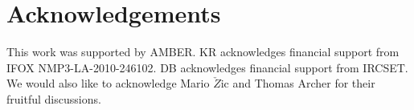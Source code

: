 \documentclass[reprint,aip,apl,floatfix,linenumbers,superscriptaddress]{revtex4-1}
\begin{document}
\section{Acknowledgements}
\label{sec:acknowledgements}
This work was supported by AMBER. KR acknowledges financial support from IFOX NMP3-LA-2010-246102. DB acknowledges financial support from IRCSET. We would also like to acknowledge Mario $\check{Z}$ic and Thomas Archer for their fruitful discussions.



\end{document}
